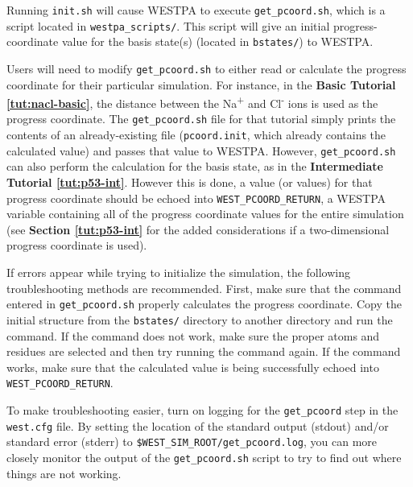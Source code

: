 Running \verb|init.sh| will cause WESTPA to execute \verb|get_pcoord.sh|, which is a script located in \verb|westpa_scripts/|. 
This script will give an initial progress-coordinate value for the basis state(s) (located in \verb|bstates/|) to WESTPA.


Users will need to modify \verb|get_pcoord.sh| to either read or calculate the progress coordinate for their particular simulation.
For instance, in the \textbf{Basic Tutorial \ref{tut:nacl-basic}}, the distance between the Na\textsuperscript{+} and Cl\textsuperscript{-} ions is used as the progress coordinate.
The \verb|get_pcoord.sh| file for that tutorial simply prints the contents of an already-existing file (\verb|pcoord.init|, which already contains the calculated value) and passes that value to WESTPA. 
However, \verb|get_pcoord.sh| can also perform the calculation for the basis state, as in the \textbf{Intermediate Tutorial \ref{tut:p53-int}}.
However this is done, a value (or values) for that progress coordinate should be echoed into \verb|WEST_PCOORD_RETURN|, a WESTPA variable containing all of the progress coordinate values for the entire simulation (see \textbf{Section \ref{tut:p53-int}} for the added considerations if a two-dimensional progress coordinate is used).

If errors appear while trying to initialize the simulation, the following troubleshooting methods are recommended. 
First, make sure that the command entered in \verb|get_pcoord.sh| properly calculates the progress coordinate. 
Copy the initial structure from the \verb|bstates/| directory to another directory and run the command. 
If the command does not work, make sure the proper atoms and residues are selected and then try running the command again. 
If the command works, make sure that the calculated value is being successfully echoed into \verb|WEST_PCOORD_RETURN|.

To make troubleshooting easier, turn on logging for the \verb|get_pcoord| step in the \verb|west.cfg| file. 
By setting the location of the standard output (stdout) and/or standard error (stderr) to \verb|$WEST_SIM_ROOT/get_pcoord.log|, you can more closely monitor the output of the \verb|get_pcoord.sh| script to try to find out where things are not working.

